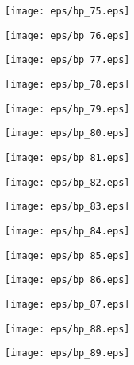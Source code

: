 \documentclass{book}
\begin{document}
	\clearpage\begin{figure}[p]
    \centering
	\texttt{[image: eps/bp\_75.eps]}
	\end{figure}
	\clearpage\begin{figure}[p]
    \centering
	\texttt{[image: eps/bp\_76.eps]}
	\end{figure}
	\clearpage\begin{figure}[p]
    \centering
	\texttt{[image: eps/bp\_77.eps]}
	\end{figure}
	\clearpage\begin{figure}[p]
    \centering
	\texttt{[image: eps/bp\_78.eps]}
	\end{figure}
	\clearpage\begin{figure}[p]
    \centering
	\texttt{[image: eps/bp\_79.eps]}
	\end{figure}
	\clearpage\begin{figure}[p]
    \centering
	\texttt{[image: eps/bp\_80.eps]}
	\end{figure}
	\clearpage\begin{figure}[p]
    \centering
	\texttt{[image: eps/bp\_81.eps]}
	\end{figure}
	\clearpage\begin{figure}[p]
    \centering
	\texttt{[image: eps/bp\_82.eps]}
	\end{figure}
	\clearpage\begin{figure}[p]
    \centering
	\texttt{[image: eps/bp\_83.eps]}
	\end{figure}
	\clearpage\begin{figure}[p]
    \centering
	\texttt{[image: eps/bp\_84.eps]}
	\end{figure}
	\clearpage\begin{figure}[p]
    \centering
	\texttt{[image: eps/bp\_85.eps]}
	\end{figure}
	\clearpage\begin{figure}[p]
    \centering
	\texttt{[image: eps/bp\_86.eps]}
	\end{figure}
	\clearpage\begin{figure}[p]
    \centering
	\texttt{[image: eps/bp\_87.eps]}
	\end{figure}
	\clearpage\begin{figure}[p]
    \centering
	\texttt{[image: eps/bp\_88.eps]}
	\end{figure}
	\clearpage\begin{figure}[p]
    \centering
	\texttt{[image: eps/bp\_89.eps]}
	\end{figure}
\end{document}
